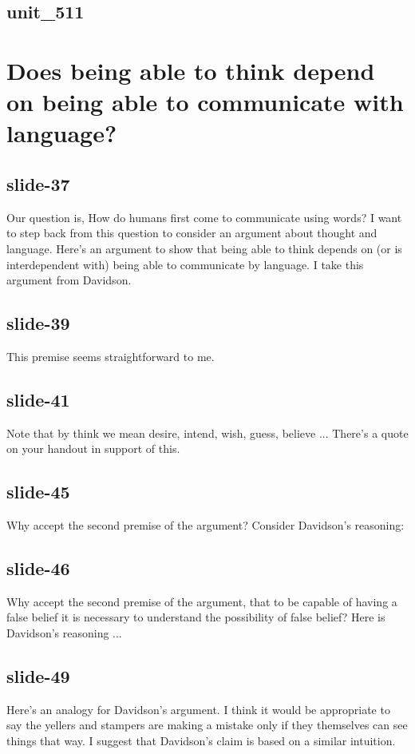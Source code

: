\documentclass[12pt,\papersize]{extarticle}
\begin{document}
 
\subsection{unit\_511}
 
\section{Does being able to think depend on being able to communicate with language?}
 
 
\subsection{slide-37}
Our question is, How do humans first come to communicate using words?
I want to step back from this question to consider an argument about thought and language.
Here's an argument to show that being able to think depends on (or is interdependent with) being able to communicate by language.
I take this argument from Davidson.
 
 
\subsection{slide-39}
This premise seems straightforward to me.
 
 
\subsection{slide-41}
Note that by think we mean desire, intend, wish, guess, believe ...
There's a quote on your handout in support of this.
 
 
\subsection{slide-45}
Why accept the second premise of the argument? Consider Davidson's reasoning:
 
 
\subsection{slide-46}
Why accept the second premise of the argument, that to be capable of having a false belief it is necessary to understand the possibility of false belief?
Here is Davidson's reasoning ...
 
 
\subsection{slide-49}
Here's an analogy for Davidson's argument.
I think it would be appropriate to say the yellers and stampers are making a mistake only if they themselves can see things that way.
I suggest that Davidson's claim is based on a similar intuition.
 
\end{document}
